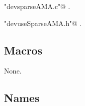 \documentclass[12pt]{article}
\begin{document}
{\small\begin{list}{}{\setlength{\itemsep}{-\parsep}\setlength{\itemindent}{-\leftmargin}}
\item \verb@"devsparseAMA.c"@ {\footnotesize {\NWtxtDefBy} .
}
\item \verb@"devuseSparseAMA.h"@ {\footnotesize {\NWtxtDefBy} .}
\end{list}}


\subsection{Macros}
\label{sec:macros}


None.




\subsection{Names}
\label{sec:names}












\end{document}
